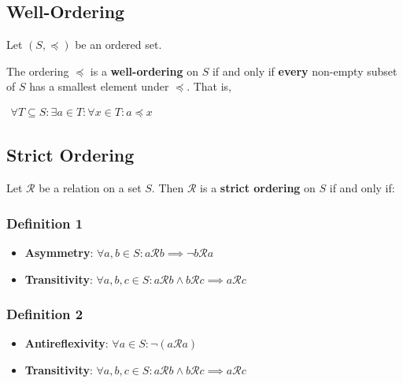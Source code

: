 \subsection{Well-Ordering}
\label{sec:well-ordering}

Let $(S, \preceq)$ be an ordered set.

The ordering $\preceq$ is a \textbf{well-ordering} on $S$ if and only
if \textbf{every} non-empty subset of $S$ has a smallest element under
$\preceq$. That is,


\begin{math}
  \begin{array}{c}
    \forall T \subseteq S: \exists a \in T : \forall x \in T : a \preceq x
  \end{array}
\end{math}

\subsection{Strict Ordering}
\label{sec:strict-ordering}

Let $\mathcal{R}$ be a relation on a set $S$. Then $\mathcal{R}$ is a
\textbf{strict ordering} on $S$ if and only if:

\subsubsection{Definition 1}

\begin{itemize}
\item \textbf{Asymmetry}:
  $\forall a, b \in S : a \mathcal{R} b \implies \neg b \mathcal{R} a$
\item \textbf{Transitivity}:
  $\forall a, b, c \in S: a \mathcal{R} b \land b \mathcal{R} c
  \implies a \mathcal{R} c$
\end{itemize}

\subsubsection{Definition 2}

\begin{itemize}
\item \textbf{Antireflexivity}:
  $\forall a \in S: \neg (a \mathcal{R} a) $
\item \textbf{Transitivity}:
  $\forall a, b, c \in S: a \mathcal{R} b \land b \mathcal{R} c
  \implies a \mathcal{R} c$
\end{itemize}

